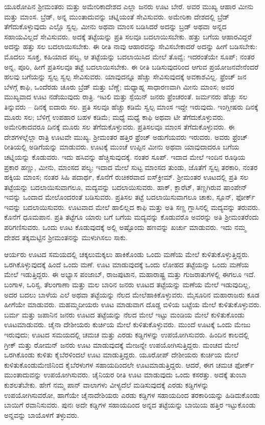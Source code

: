 ಯೂರೋಪಿನ ಶ‍್ರೀಮಂತರು ಮತ್ತು ಅಮೇರಿಕಾದೇಶದ ಎಲ್ಲಾ ಜನರು ಊಟ ಬೇರೆ. ಅವರ ಮುಖ್ಯ ಆಹಾರ ಮೀನು ಮತ್ತು ಮಾಂಸ. ಬ್ರೆಡ್​, ಅನ್ನ ಮುಂತಾದುವನ್ನು ಚಟ್ನಿಯಂತೆ ಸೇವಿಸುವರು. ಅಮೇರಿಕಾ ದೇಶದಲ್ಲಿ ಬ್ರೆಡ್​ ತೆಗೆದುಕೊಳ್ಳುವುದು ಎಲ್ಲೊ ಸ್ವಲ್ಪ. ಮೀನು ಅಥವಾ ಮಾಂಸ ಬಡಿಸಿದರೆ ಅದನ್ನು ಬ್ರಡ್​ ಅಥವಾ ಅನ್ನದ ಸಹಾಯವಿಲ್ಲದೆ ಸೇವಿಸುವರು. ಅದಕ್ಕೆ ತಟ್ಟೆಯನ್ನು ಪ್ರತಿ ಸಲವೂ ಬದಲಾಯಿಸಬೇಕು. ಹತ್ತು ಬಗೆಯ ಆಹಾರವಿದ್ದರೆ ಅದನ್ನು ಹತ್ತು ಸಲ ಬದಲಾಯಿಸಬೇಕು. ಈ ರೀತಿ ನಾವು ಆಹಾರವನ್ನು ಸೇವಿಸಬೇಕಾದರೆ ಅದನ್ನು ಹೀಗೆ ಬಡಿಸಬೇಕು: ಮೊದಲು ಸೂಕ್ತ, ಕಹಿಯಾದ ಪಲ್ಯ, ಆ ತಟ್ಟೆಯನ್ನು ಬದಲಾಯಿಸಿದ ಮೇಲೆ ತೊವ್ವೆ; ಇದರಂತೆಯೇ ಸೂಪ್​; ನಂತರ ಅನ್ನ, ಪೂರಿ, ಹೀಗೆ ಪ್ರತಿಸಲವೂ ತಟ್ಟೆ ಬದಲಾಯಿಸಬೇಕು. ಈ ರೀತಿ ಬಡಿಸುವುದರಿಂದ ಆಗುವ ಪ್ರಯೋಜನವೇನೆಂದರೆ ಹಲವು ಬಗೆಯನ್ನು ಸ್ವಲ್ಪ ಸ್ವಲ್ಪ ಸೇವಿಸುವರು. ಯಾವುದನ್ನೂ ಹೆಚ್ಚು ಸೇವಿಸುವುದಕ್ಕೆ ಅವಕಾಶವಿಲ್ಲ. ಫ್ರೆಂಚ್​ ಜನ ಬೆಳಗ್ಗೆ ಕಾಫಿ, ಒಂದೆರಡು ಚೂರು ಬ್ರೆಡ್​ ಮತ್ತು ಬೆಣ್ಣೆ; ಮಧ್ಯಾಹ್ನ ಸಾಧಾರಣವಾಗಿ ಮೀನು ಮಾಂಸ; ಅವರ ಮುಖ್ಯವಾದ ಊಟ ನಡೆಯುವುದು ರಾತ್ರಿ. ಇಟಲಿ ಮತ್ತು ಸ್ಪೆಯಿನ್​ ಜನರು ಫ್ರೆಂಚರಂತೆ. ಜರ್ಮನರು ಹೆಚ್ಚು ಸಲ ತಿನ್ನುವರು – ದಿನಕ್ಕೆ ಐದಾರು ಸಲ. ಪ್ರತಿ ಸಲವೂ ಹೆಚ್ಚು ಕಡಿಮೆ ಸ್ವಲ್ಪ ಮಾಂಸ ಇದ್ದೇ ಇರುವುದು. ಇಂಗ್ಲೀಷರು ದಿನಕ್ಕೆ ಮೂರು ಸಲ; ಬೆಳಿಗ್ಗೆ ಉಪಹಾರ ಬಹಳ ಕಡಿಮೆ; ಮಧ್ಯೆ ಮಧ್ಯೆ ಕಾಫಿ ಅಥವಾ ಟೀ ತೆಗೆದುಕೊಳ್ಳುವರು. ಅಮೇರಿಕಾದವರೂ ದಿನಕ್ಕೆ ಮೂರು ಸಲ ತೆಗೆದುಕೊಳ್ಳುವರು. ಪ್ರತಿಸಲವೂ ಮಾಂಸ ತೆಗೆದುಕೊಳ್ಳುವರು. ಈ ದೇಶಗಳಲ್ಲೆಲ್ಲಾ ರಾತ್ರಿ ಊಟವೇ ಮುಖ್ಯ. ಶ‍್ರೀಮಂತರ ಹತ್ತಿರ ಫ್ರೆಂಚ್​ ಅಡುಗೆಯವರು ಇರುವರು. ಅವರು ಫ್ರೆಂಚ್ ರೀತಿಯಲ್ಲಿ ಅಡಿಗೆಯನ್ನು ಮಾಡುವರು. ಊಟಕ್ಕೆ ಮುಂಚೆ ಉಪ್ಪಿನ ಮೀನು ಅಥವಾ ಯಾವುದಾದರೂ ಬಗೆಯ ಚಟ್ನಿಯನ್ನು ಕೊಡುವರು. ಇದು ಹಸಿವನ್ನು ಹೆಚ್ಚಿಸುವುದಕ್ಕೆ. ನಂತರ ಸೂಪ್​. ಇದಾದ ಮೇಲೆ ಇಂದಿನ ರೂಢಿಯ ಪ್ರಕಾರ ಹಣ್ಣು, ಮೀನು, ಮಾಂಸದ ಪಲ್ಯ; ಇದಾದ ಮೇಲೆ ಸುಟ್ಟ ಮಾಂಸದ ತುಂಡು, ಜೊತೆಗೆ ಸ್ವಲ್ಪ ತರಕಾರಿ, ನಂತರ ಹಕ್ಕಿಯ ಮಾಂಸ; ನಂತರ ಸಿಹಿ ಪದಾರ್ಥ, ಕೊನೆಗೆ ರುಚಿಕರವಾದ ಐಸ್​ಕ್ರೀಮ್​. ಶ‍್ರೀಮಂತರ ಊಟದಲ್ಲಿ ಪ್ರತಿ ಸಲ ತಟ್ಟೆಯನ್ನು ಬದಲಾಯಿಸುವಾಗಲೂ, ಮದ್ಯವನ್ನು ಬದಲಾಯಿಸುವರು. ಹಾಕ್​, ಕ್ಲಾರೆಟ್​, ತಣ್ಣಗಿರುವ ಷಾಂಪೇನ್​ ಇವನ್ನು ಒಂದಾದ ಮೇಲೊಂದರಂತೆ ಬಡಿಸುವರು. ಪ್ರತಿಸಲ ತಟ್ಟೆ ಬದಲಾಯಿಸುವಾಗಲೂ ಚಾಕು, ಸ್ಪೂನ್​, ಫೋರ್ಕ್​ ಇವನ್ನು ಬದಲಾಯಿಸುವರು. ಊಟವಾದ ಮೇಲೆ ಹಾಲಿಲ್ಲದ ಕಾಫಿ ಮತ್ತು ಅತಿ ಸಣ್ಣ ಗ್ಲಾಸಿನಲ್ಲಿ ಮದ್ಯವನ್ನು ತರುವರು. ಕೊನೆಗೆ ಧೂಮಪಾನ. ಪ್ರತಿ ತಟ್ಟೆಗೂ ಯಾರು ಬಗೆ ಬಗೆಯ ಮದ್ಯವನ್ನು ಕೊಡುವರೊ ಅವರನ್ನು ಅತಿ ಶ‍್ರೀಮಂತರೆಂದು ಪರಿಗಣಿಸುವರು. ಒಂದು ಊಟ ಕೊಡುವುದಕ್ಕೆ ಅಲ್ಲಿ ಅಷ್ಟೊಂದು ಹಣವನ್ನು ಖರ್ಚು ಮಾಡುವರು. ಇದು ನಮ್ಮ ದೇಶದ ತಕ್ಕಮಟ್ಟಿನ ಶ‍್ರೀಮಂತನನ್ನು ಮುಳುಗಿಸಲು ಸಾಕು.

ಆರ್ಯರು ಊಟದ ಸಮಯದಲ್ಲಿ ಚಕ್ಕಲುಮಕ್ಕಲು ಹಾಕಿಕೊಂಡು ಒಂದು ಮಣೆಯ ಮೇಲೆ ಕುಳಿತುಕೊಳ್ಳುತ್ತಿದ್ದರು. ಒರಗಿಕೊಳ್ಳುವುದಕ್ಕೆ ಹಿಂದೆ ಒಂದು ಮಣೆ. ಊಟ ಮಾಡುವುದಕ್ಕೆ ಒಂದು ಲೋಹದ ತಟ್ಟೆಯನ್ನು ಒಂದು ಮಣೆಯ ಮೇಲೆ ಇಡುತ್ತಿದ್ದರು. ಈ ಅಭ್ಯಾಸ ಪಂಜಾಬ್​, ರಾಜಪುಟಾನ, ಮಹಾರಾಷ್ಟ್ರ ಮತ್ತು ಗುಜರಾತುಗಳಲ್ಲಿ ಈಗಲೂ ಇದೆ. ಬಂಗಾಳ, ಒರಿಸ್ಸ, ತೆಲಂಗಾಣಾ ಮತ್ತು ಮಲ ಬಾರಿನ ಜನರು ಊಟದ ತಟ್ಟೆಯನ್ನು ಮಣೆಯ ಮೇಲೆ ಇಡುವುದಿಲ್ಲ, ಅದರ ಬದಲು ಬಾಳೆಯ ಎಲೆ ಅಥವಾ ತಟ್ಟೆಯನ್ನು ನೆಲದ ಮೇಲೆಹಾಕಿಕೊಳ್ಳುವರು. ಮೈಸೂರಿನ ಮಹಾರಾಜರು ಕೂಡ ಹೀಗೆಯೇ ಮಾಡುವರು. ಮಹಮ್ಮದೀಯರು ಊಟ ಮಾಡುವಾಗ ದೊಡ್ಡ ಬಿಳಿಯ ಬಟ್ಟೆಯ ಮೇಲೆ ಕುಳಿತುಕೊಳ್ಳುವರು. ಬರ್ಮ ಮತ್ತು ಜಪಾನಿನ ಜನರು ಊಟದ ತಟ್ಟೆಯನ್ನು ನೆಲದ ಮೇಲೆ ಇಟ್ಟು ಮಂಡಿಯ ಮೇಲೆ ಕುಳಿತುಕೊಂಡು ಊಟಮಾಡುವರು. ಚೈನಾ ದೇಶೀಯರು ಕುರ್ಚಿಯ ಮೇಲೆ ಕುಳಿತುಕೊಳ್ಳುವರು. ಮುಂದೆ ಊಟಕ್ಕೆ ಒಂದು ಮೇಜು ಇರುವುದು; ಊಟದ ಸಮಯದಲ್ಲಿ ಚಮಚ ಮತ್ತು ಎರಡು ಕಡ್ಡಿಗಳನ್ನು ಉಪಯೋಗಿಸುವರು. ಹಿಂದಿನ ಕಾಲದಲ್ಲಿ ಗ್ರೀಕ್​ ಮತ್ತು ರೋಮನ್​ ಜನರು ಊಟ ಮಾಡುವುದಕ್ಕೆ ಮೇಜನ್ನೇ ಉಪಯೋಗಿಸುತ್ತಿದ್ದರು. ಮಂಚದ ಮೇಲೆ ಒರಗಿಕೊಂಡು ಕುಳಿತು ಕೈಬೆರಳಿಂದಲೆ ಊಟ ಮಾಡುತ್ತಿದ್ದರು. ಯೂರೋಪ್​ ದೇಶೀಯರು ಕುರ್ಚಿಯ ಮೇಲೆ ಕುಳಿತುಕೊಂಡು\break ಮೇಜಿನಿಂದ ಕೈಬೆರಳುಗಳ ಸಹಾಯದಿಂದಲೇ ಊಟಮಾಡುತ್ತಿದ್ದರು. ಆದರೆ, ಈಗ ಚಮಚ ಫೋರ್ಕ್​ ಮುಂತಾದುವನ್ನು ಉಪಯೋಗಿಸುವರು. ಚೈನಿಯರ ರೀತಿ ಊಟ ಮಾಡುವುದು ಒಂದು ಕಸರತ್ತು. ಅದಕ್ಕೆ ತುಂಬಾ ಕುಶಲತೆಬೇಕು. ಹೇಗೆ ನಮ್ಮ ಪಾನ್ ವಾಲಾಗಳು ವೀಳ್ಯದೆಲೆ ಮಡಿಸುವುದಕ್ಕೆ ಎರಡು ಕಡ್ಡಿಗಳನ್ನು ಉಪಯೋಗಿಸುವರೋ, ಹಾಗೆಯೇ ಚೈನಾದೇಶಿಯರು ಎರಡು ಕಡ್ಡಿಗಳ ಸಹಾಯದಿಂದ ತರಕಾರಿಯನ್ನು ಹಿಡಿದುಕೊಂಡು ಬಾಯಿಗೆ ರವಾನಿಸುವರು. ಪುನಃ ಅದೇ ಕಡ್ಡಿಗಳ ಸಹಾಯದಿಂದ ಅನ್ನದ ತಟ್ಟೆಯನ್ನು ಬಾಯಿಯ ಹತ್ತಿರ ಇಟ್ಟುಕೊಂಡು ಅನ್ನವನ್ನು ಬಾಯೊಳಗೆ ತಳ್ಳುವರು.

